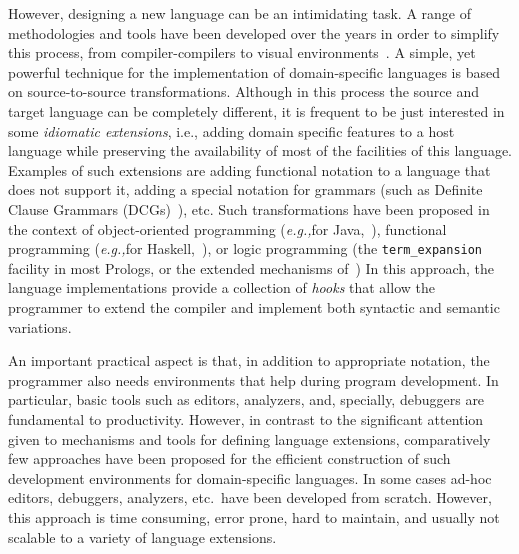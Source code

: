 \documentclass[preprint]{llncs}
\newcommand{\eg}{\emph{e.g.,\xspace}}
\newcommand{\pre}[1]{\texttt{#1}}
\begin{document}
However, designing a new language can be an intimidating task.  A
range of methodologies and tools have been developed over the years in
order to simplify this process, from compiler-compilers to visual
environments~\cite{mernik05}.
A simple, yet powerful technique for the implementation of
domain-specific languages is based on source-to-source
transformations. Although in this process the source and target
language can be completely different, it is frequent to be just
interested in some \emph{idiomatic extensions}, i.e., adding domain
specific features to a host language while preserving the availability
of most of the facilities of this language. Examples of such
extensions are adding functional notation to a language that does not
support it, adding a special notation for grammars (such as
Definite Clause Grammars (DCGs)~\cite{PereiraWarren80}), etc.
Such transformations have been proposed in the context of
object-oriented programming (\eg for Java,~\cite{nystrom:polyglot}), functional
programming (\eg for Haskell,~\cite{edsl}), or logic programming (the
\pre{term\_expansion} facility in most Prologs, or the extended
mechanisms
of~\cite{ciao-modules-cl2000,hermenegildo11:ciao-design-tplp})
In this approach, the language implementations provide a collection of
\emph{hooks} that allow the programmer to extend the compiler and
implement both syntactic and semantic variations.

An important practical aspect is that, in addition to appropriate
notation, the programmer also needs environments that help during
program development. In particular, basic tools such as editors,
analyzers, and, specially, debuggers are fundamental to productivity.
However, in contrast to the significant attention given to mechanisms
and tools for defining language extensions, comparatively few
approaches have been proposed for the efficient construction of such
development environments for domain-specific languages. In some cases
ad-hoc editors, debuggers, analyzers, etc.\ have been developed from
scratch.
However, this approach is time consuming, error prone, hard to
maintain, and usually not scalable to a variety of language
extensions.
\end{document}
